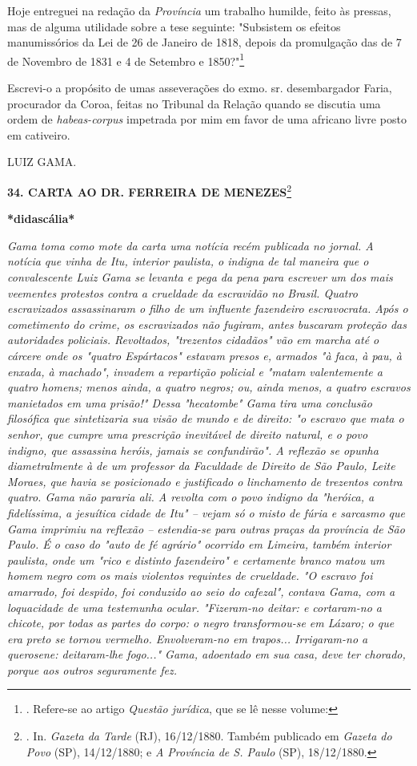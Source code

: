 Hoje entreguei na redação da \emph{Província} um trabalho humilde, feito
às pressas, mas de alguma utilidade sobre a tese seguinte: "Subsistem os
efeitos manumissórios da Lei de 26 de Janeiro de 1818, depois da
promulgação das de 7 de Novembro de 1831 e 4 de Setembro e
1850?"\footnote{. Refere-se ao artigo \emph{Questão jurídica}, que se lê
  nesse volume:}

Escrevi-o a propósito de
umas asseverações do exmo. sr. desembargador Faria, procurador da Coroa,
feitas no Tribunal da Relação quando se discutia uma ordem de
\emph{habeas-corpus} impetrada por mim em favor de uma africano livre
posto em cativeiro.

LUIZ GAMA.

\textbf{34. CARTA AO DR. FERREIRA DE MENEZES}\footnote{. In.
  \emph{Gazeta da Tarde} (RJ), 16/12/1880. Também publicado em
  \emph{Gazeta do Povo} (SP), 14/12/1880; e \emph{A Província de S.
  Paulo} (SP), 18/12/1880.}

\textbf{*didascália*}

\emph{Gama toma como mote da carta uma notícia recém publicada no
jornal. A notícia que vinha de Itu, interior paulista, o indigna de tal
maneira que o convalescente Luiz Gama se levanta e pega da pena para
escrever um dos mais veementes protestos contra a crueldade da
escravidão no Brasil. Quatro escravizados assassinaram o filho de um
influente fazendeiro escravocrata. Após o cometimento do crime, os
escravizados não fugiram, antes buscaram proteção das autoridades
policiais. Revoltados, "trezentos cidadãos" vão em marcha até o cárcere
onde os "quatro Espártacos" estavam presos e, armados "à faca, à pau, à
enxada, à machado", invadem a repartição policial e "matam valentemente
a quatro homens; menos ainda, a quatro negros; ou, ainda menos, a quatro
escravos manietados em uma prisão!" Dessa "hecatombe" Gama tira uma
conclusão filosófica que sintetizaria sua visão de mundo e de direito:
"o escravo que mata o senhor, que cumpre uma prescrição inevitável de
direito natural, e o povo indigno, que assassina heróis, jamais se
confundirão". A reflexão se opunha diametralmente à de um professor da
Faculdade de Direito de São Paulo, Leite Moraes, que havia se
posicionado e justificado o linchamento de trezentos contra quatro. Gama
não pararia ali. A revolta com o povo indigno da "heróica, a
fidelíssima, a jesuítica cidade de Itu" -- vejam só o misto de fúria e
sarcasmo que Gama imprimiu na reflexão -- estendia-se para outras praças
da província de São Paulo. É o caso do "auto de fé agrário" ocorrido em
Limeira, também interior paulista, onde um "rico e distinto fazendeiro"
e certamente branco matou um homem negro com os mais violentos requintes
de crueldade. "O escravo foi amarrado, foi despido, foi conduzido ao
seio do cafezal", contava Gama, com a loquacidade de uma testemunha
ocular. "Fizeram-no deitar: e cortaram-no a chicote, por todas as partes
do corpo: o negro transformou-se em Lázaro; o que era preto se tornou
vermelho. Envolveram-no em trapos... Irrigaram-no a querosene:
deitaram-lhe fogo..." Gama, adoentado em sua casa, deve ter chorado,
porque aos outros seguramente fez. }


